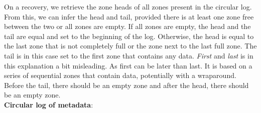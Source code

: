 On a recovery, we retrieve the zone heads of all zones present in the circular log. From this, we can infer the head and tail, provided there is at least one zone free between the two or all zones are empty. If all zones are empty, the head and the tail are equal and set to the beginning of the log. Otherwise, the head is equal to the last zone that is not completely full or the zone next to the last full zone. The tail is in this case set to the first zone that contains any data. \textit{First} and \textit{last} is in this explanation a bit misleading. As first can be later than last. It is based on a series of sequential zones that contain data, potentially with a wraparound. Before the tail, there should be an empty zone and after the head, there should be an empty zone.  \\
\textbf{Circular log of metadata}:\\
